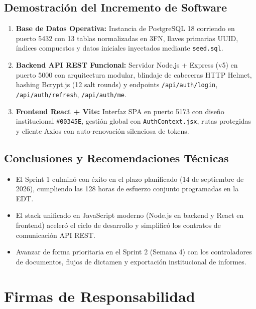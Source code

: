 \documentclass[12pt,a4paper]{article}
\begin{document}
\subsection{Demostración del Incremento de Software}
\begin{enumerate}[leftmargin=1.5em, itemsep=2pt]
    \item \textbf{Base de Datos Operativa:} Instancia de PostgreSQL 18 corriendo en puerto 5432 con 13 tablas normalizadas en 3FN, llaves primarias UUID, índices compuestos y datos iniciales inyectados mediante \texttt{seed.sql}.
    \item \textbf{Backend API REST Funcional:} Servidor Node.js + Express (v5) en puerto 5000 con arquitectura modular, blindaje de cabeceras HTTP Helmet, hashing Bcrypt.js (12 salt rounds) y endpoints \texttt{/api/auth/login}, \texttt{/api/auth/refresh}, \texttt{/api/auth/me}.
    \item \textbf{Frontend React + Vite:} Interfaz SPA en puerto 5173 con diseño institucional \texttt{\#00345E}, gestión global con \texttt{AuthContext.jsx}, rutas protegidas y cliente Axios con auto-renovación silenciosa de tokens.
\end{enumerate}

\subsection{Conclusiones y Recomendaciones Técnicas}
\begin{itemize}[leftmargin=1.5em, itemsep=2pt]
    \item El Sprint 1 culminó con éxito en el plazo planificado (14 de septiembre de 2026), cumpliendo las 128 horas de esfuerzo conjunto programadas en la EDT.
    \item El stack unificado en JavaScript moderno (Node.js en backend y React en frontend) aceleró el ciclo de desarrollo y simplificó los contratos de comunicación API REST.
    \item Avanzar de forma prioritaria en el Sprint 2 (Semana 4) con los controladores de documentos, flujos de dictamen y exportación institucional de informes.
\end{itemize}

\vspace{0.3cm}

\section{Firmas de Responsabilidad}
\end{document}
